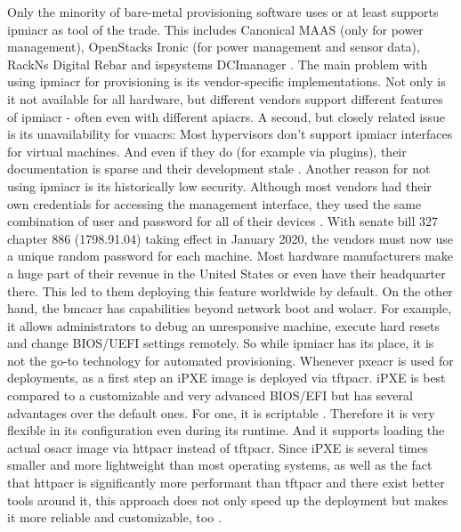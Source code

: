 \newline
Only the minority of bare-metal provisioning software uses or at least supports \gls{ipmiacr} as tool of the trade. This includes Canonical MAAS (only for power management), OpenStacks Ironic (for power management and sensor data), RackNs Digital Rebar and ispsystems DCImanager \cite{maas_snap_power_management} \cite{openstack_ironic_docs} \cite{rackn_what_is_digital_rebar} \cite{ispsystem_dcimanager}.
The main problem with using \gls{ipmiacr} for provisioning is its vendor-specific implementations. Not only is it not available for all hardware, but different vendors support different features of \gls{ipmiacr} - often even with different \gls{apiacr}s. A second, but closely related issue is its unavailability for \gls{vmacr}s: Most hypervisors don't support \gls{ipmiacr} interfaces for virtual machines. And even if they do (for example via plugins), their documentation is sparse and their development stale \cite{openstack_virtualbmc}.
\newline
Another reason for not using \gls{ipmiacr} is its historically low security. Although most vendors had their own credentials for accessing the management interface, they used the same combination of user and password for all of their devices \cite{bmc_default_passwords}. With senate bill 327 chapter 886 (1798.91.04) taking effect in January 2020, the vendors must now use a unique random password for each machine. Most hardware manufacturers make a huge part of their revenue in the United States or even have their headquarter there. 
This led to them deploying this feature worldwide by default.
\newline
On the other hand, the \gls{bmcacr} has capabilities beyond network boot and \gls{wolacr}. For example, it allows administrators to debug an unresponsive machine, execute hard resets and change BIOS/UEFI settings remotely.
So while \gls{ipmiacr} has its place, it is not the go-to technology for automated provisioning.
\newline
Whenever \gls{pxeacr} is used for deployments, as a first step an iPXE image is deployed via \gls{tftpacr}. iPXE is best compared to a customizable and very advanced BIOS/EFI but has several advantages over the default ones. For one, it is scriptable \cite{ipxe_scripting}. Therefore it is very flexible in its configuration even during its runtime. And it supports loading the actual \gls{osacr} image via \gls{httpacr} instead of \gls{tftpacr}. Since iPXE is several times smaller and more lightweight than most operating systems, as well as the fact that \gls{httpacr} is significantly more performant than \gls{tftpacr} and there exist better tools around it, this approach does not only speed up the deployment but makes it more reliable and customizable, too \cite{ipxe_uefi_http} \cite{why_ipxe} \cite{foreman_ipxe} \cite{jpmens_network_boot_http}.
